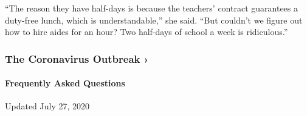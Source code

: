 ``The reason they have half-days is because the teachers' contract
guarantees a duty-free lunch, which is understandable,'' she said. ``But
couldn't we figure out how to hire aides for an hour? Two half-days of
school a week is ridiculous.''

\href{https://www.nytimes3xbfgragh.onion/news-event/coronavirus?action=click\&pgtype=Article\&state=default\&region=MAIN_CONTENT_3\&context=storylines_faq}{}

\hypertarget{the-coronavirus-outbreak-}{%
\subsubsection{The Coronavirus Outbreak
›}\label{the-coronavirus-outbreak-}}

\hypertarget{frequently-asked-questions}{%
\paragraph{Frequently Asked
Questions}\label{frequently-asked-questions}}

Updated July 27, 2020

